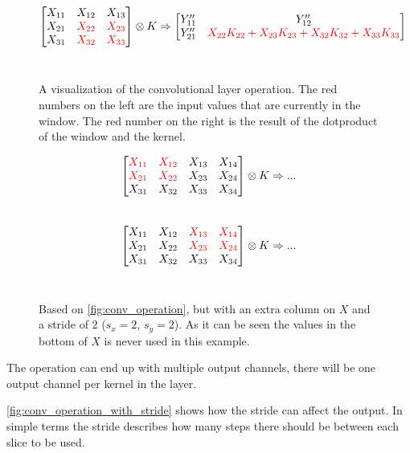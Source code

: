 \begin{figure}
$$\begin{bmatrix}
        X_{11} & X_{12} & X_{13} \\
        X_{21} & \color{red} X_{22} & \color{red} X_{23} \\
        X_{31} & \color{red} X_{32} & \color{red} X_{33}
    \end{bmatrix} \otimes K \Rightarrow \begin{bmatrix}
         Y''_{11} & Y''_{12} \\
         Y''_{21} & \color{red} X_{22} K_{22} + X_{23} K_{23} + X_{32} K_{32} + X_{33} K_{33}
    \end{bmatrix}$$\\
    \caption{A visualization of the convolutional layer operation. The red numbers on the left are the input values that are currently in the window. The red number on the right is the result of the dotproduct of the window and the kernel.}
    \label{fig:conv_operation}
\end{figure}

\begin{figure}
    \centering
    $$\begin{bmatrix}
        \color{red} X_{11} & \color{red} X_{12} & X_{13} & X_{14} \\
        \color{red} X_{21} & \color{red} X_{22} & X_{23} & X_{24} \\
        X_{31} & X_{32} & X_{33} & X_{34}
    \end{bmatrix} \otimes K \Rightarrow ...$$\\
    $$\begin{bmatrix}
        X_{11} & X_{12} & \color{red} X_{13} & \color{red} X_{14} \\
        X_{21} & X_{22} & \color{red} X_{23} & \color{red} X_{24} \\
        X_{31} & X_{32} & X_{33} & X_{34}
    \end{bmatrix} \otimes K \Rightarrow ...$$\\
    \caption{Based on \autoref{fig:conv_operation}, but with an extra column on $X$ and a stride of 2 ($s_x = 2$, $s_y=2$). As it can be seen the values in the bottom of $X$ is never used in this example.}
    \label{fig:conv_operation_with_stride}
\end{figure}

The operation can end up with multiple output channels, there will be one output channel per kernel in the layer.

\autoref{fig:conv_operation_with_stride} shows how the stride can affect the output. In simple terms the stride describes how many steps there should be between each slice to be used.

